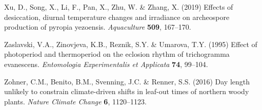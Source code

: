 \documentclass[11pt]{article}
\begin{document}
\begin{thebibliography}{49}
Xu, D., Song, X., Li, F., Pan, X., Zhu, W. \& Zhang, X. (2019) Effects of
  desiccation, diurnal temperature changes and irradiance on archeospore
  production of pyropia yezoensis. \emph{Aquaculture} \textbf{509}, 167--170.

Zaslavski, V.A., Zinovjeva, K.B., Reznik, S.Y. \& Umarova, T.Y. (1995) Effect
  of photoperiod and thermoperiod on the eclosion rhythm of trichogramma
  evanescens. \emph{Entomologia Experimentalis et Applicata} \textbf{74},
  99--104.

Zohner, C.M., Benito, B.M., Svenning, J.C. \& Renner, S.S. (2016) Day length
  unlikely to constrain climate-driven shifts in leaf-out times of northern
  woody plants. \emph{Nature Climate Change} \textbf{6}, 1120--1123.

\end{thebibliography}
\end{document}
